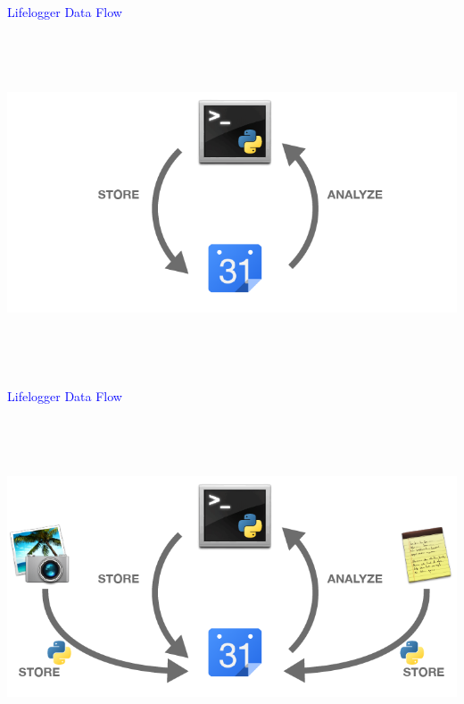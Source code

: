 \documentclass[landscape]{slides}
\begin{document}
\begin{slide}

    \textcolor{blue}{\Large{Lifelogger Data Flow}}

    \begin{center}
        \includegraphics[height=10cm]{lifelog-input-basic}
    \end{center}

\end{slide}


\begin{slide}

    \textcolor{blue}{\Large{Lifelogger Data Flow}}

    \begin{center}
        \includegraphics[height=10cm]{lifelog-input-extended}
    \end{center}

\end{slide}
\end{document}
